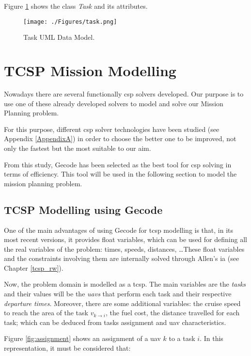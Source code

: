 Figure \ref{fig:task} shows the class \textit{Task} and its attributes.

\begin{figure}[h]
\centering
\texttt{[image: ./Figures/task.png]}
\caption{Task UML Data Model.}
\label{fig:task}
\end{figure}


\section{TCSP Mission Modelling}\label{tcspmodel}

Nowadays there are several functionally \gls{csp} solvers developed. Our purpose is to use one of these already developed solvers to model and solve our Mission Planning problem.

For this purpose, different \gls{csp} solver technologies have been studied (see Appendix \ref{AppendixA}) in order to choose the better one to be improved, not only the fastest but the most suitable to our aim.

From this study, Gecode \cite{SchulteEtAl2010} has been selected as the best tool for \gls{csp} solving in terms of efficiency. This tool will be used in the following section to model the mission planning problem.

\subsection{TCSP Modelling using Gecode}
One of the main advantages of using Gecode for \gls{tcsp} modelling is that, in its most recent versions, it provides float variables, which can be used for defining all the real variables of the problem: times, speeds, distances, \ldots These float variables and the constraints involving them are internally solved through Allen's \gls{ia} (see Chapter \ref{tcsp_rw}).

Now, the problem domain is modelled as a \gls{tcsp}. The main variables are the \textit{tasks} and their values will be the \textit{\glspl{uav}} that perform each task and their respective \textit{departure times}. Moreover, there are some additional variables: the cruise speed to reach the area of the task $v_{k \to i}$, the fuel cost, the distance travelled for each task; which can be deduced from tasks assignment and \gls{uav} characteristics.

Figure \ref{fig:assignment} shows an assignment of a \gls{uav} $k$ to a task $i$. In this representation, it must be considered that:

